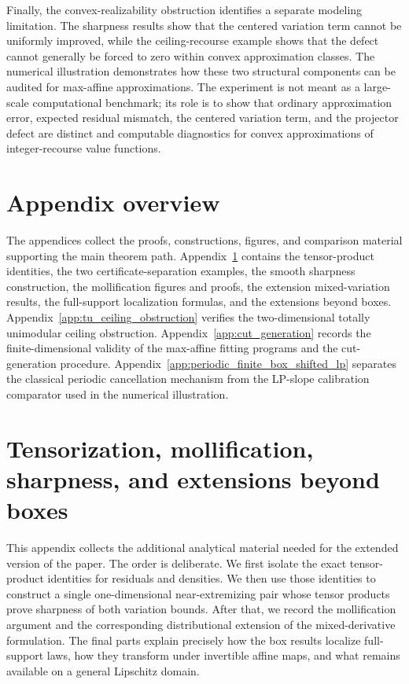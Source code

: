 \documentclass[11pt,letterpaper]{article}
\theoremstyle{definition}
\theoremstyle{remark}
\begin{document}
Finally, the convex-realizability obstruction identifies a separate modeling
limitation. The sharpness results show that the centered variation term cannot
be uniformly improved, while the ceiling-recourse example shows that the
defect cannot generally be forced to zero within convex approximation classes.
The numerical illustration demonstrates how these two structural components
can be audited for max-affine approximations. The experiment is not meant as a
large-scale computational benchmark; its role is to show that ordinary
approximation error, expected residual mismatch, the centered variation term,
and the projector defect are distinct and computable diagnostics for convex
approximations of integer-recourse value functions.

\appendix

\section*{Appendix overview}

The appendices collect the proofs, constructions, figures, and comparison
material supporting the main theorem path. Appendix~\ref{app:tensorization_mollification_sharpness_extensions}
contains the tensor-product identities, the two certificate-separation examples,
the smooth sharpness construction, the mollification figures and proofs, the
extension mixed-variation results, the full-support localization formulas, and
the extensions beyond boxes. Appendix~\ref{app:tu_ceiling_obstruction}
verifies the two-dimensional totally unimodular ceiling obstruction.
Appendix~\ref{app:cut_generation} records the finite-dimensional validity of
the max-affine fitting programs and the cut-generation procedure.
Appendix~\ref{app:periodic_finite_box_shifted_lp} separates the classical
periodic cancellation mechanism from the LP-slope calibration comparator
used in the numerical illustration.
 
\section{Tensorization, mollification, sharpness, and extensions beyond boxes}
\label{app:tensorization_mollification_sharpness_extensions}
 

This appendix collects the additional analytical material needed for the
extended version of the paper. The order is deliberate. We first isolate the
exact tensor-product identities for residuals and densities. We then use those
identities to construct a single one-dimensional near-extremizing pair whose
tensor products prove sharpness of both variation bounds. After that, we record
the mollification argument and the corresponding distributional extension of
the mixed-derivative formulation. The final parts explain precisely how the box
results localize full-support laws, how they transform under invertible affine
maps, and what remains available on a general Lipschitz domain.
\end{document}

